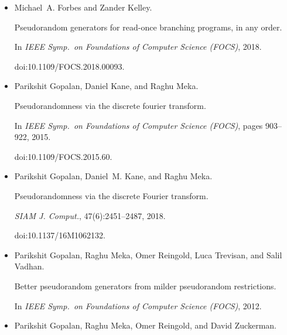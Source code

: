\documentclass[10pt,a4paper]{article}
\begin{document}
\begin{itemize}
David S. Dummit and Richard M. Foote.


\emph{Abstract Algebra}.


Wiley, 3rd edition, 2004.





\item[] 
[16]

Michael A. Forbes and Zander Kelley.


Pseudorandom generators for read-once branching programs, in any
order.


In \emph{IEEE Symp. on Foundations of Computer Science (FOCS)}, 2018.


doi:10.1109/FOCS.2018.00093.





\item[] 
[17]

Parikshit Gopalan, Daniel Kane, and Raghu Meka.


Pseudorandomness via the discrete fourier transform.


In \emph{IEEE Symp. on Foundations of Computer Science (FOCS)}, pages
903–922, 2015.


doi:10.1109/FOCS.2015.60.





\item[] 
[18]

Parikshit Gopalan, Daniel M. Kane, and Raghu Meka.


Pseudorandomness via the discrete Fourier transform.


\emph{SIAM J. Comput.}, 47(6):2451–2487, 2018.


doi:10.1137/16M1062132.





\item[] 
[19]

Parikshit Gopalan, Raghu Meka, Omer Reingold, Luca Trevisan, and Salil Vadhan.


Better pseudorandom generators from milder pseudorandom restrictions.


In \emph{IEEE Symp. on Foundations of Computer Science (FOCS)}, 2012.





\item[] 
[20]

Parikshit Gopalan, Raghu Meka, Omer Reingold, and David Zuckerman.



\end{itemize}
\end{document}
